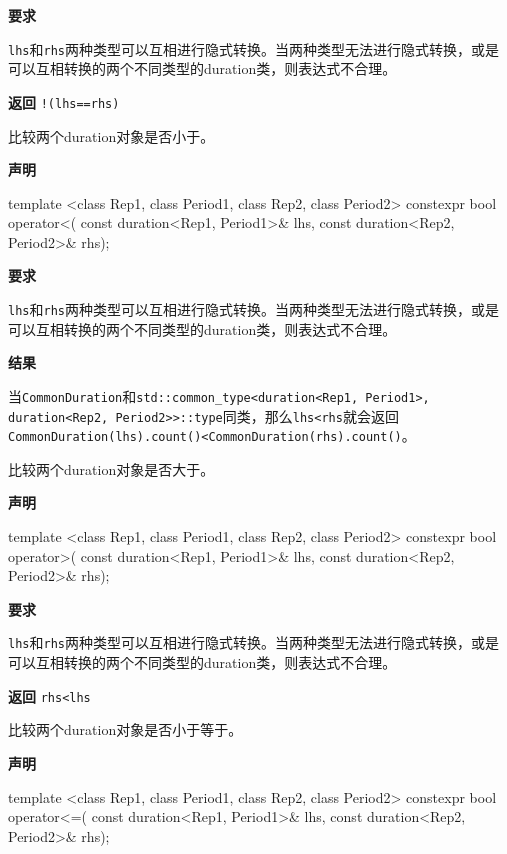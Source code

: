 \textbf{要求}

\texttt{lhs}和\texttt{rhs}两种类型可以互相进行隐式转换。当两种类型无法进行隐式转换，或是可以互相转换的两个不同类型的duration类，则表达式不合理。

\textbf{返回}
\texttt{!(lhs==rhs)}


比较两个duration对象是否小于。

\textbf{声明}

\begin{cpp}
template <class Rep1, class Period1, class Rep2, class Period2>
constexpr bool operator<(
   const duration<Rep1, Period1>& lhs,
   const duration<Rep2, Period2>& rhs);
\end{cpp}

\textbf{要求}

\texttt{lhs}和\texttt{rhs}两种类型可以互相进行隐式转换。当两种类型无法进行隐式转换，或是可以互相转换的两个不同类型的duration类，则表达式不合理。

\textbf{结果}

当\texttt{CommonDuration}和\texttt{std::common\_type<duration<Rep1, Period1>, duration<Rep2, Period2>>::type}同类，那么\texttt{lhs<rhs}就会返回\texttt{CommonDuration(lhs).count()<CommonDuration(rhs).count()}。


比较两个duration对象是否大于。

\textbf{声明}

\begin{cpp}
template <class Rep1, class Period1, class Rep2, class Period2>
constexpr bool operator>(
   const duration<Rep1, Period1>& lhs,
   const duration<Rep2, Period2>& rhs);
\end{cpp}

\textbf{要求}

\texttt{lhs}和\texttt{rhs}两种类型可以互相进行隐式转换。当两种类型无法进行隐式转换，或是可以互相转换的两个不同类型的duration类，则表达式不合理。

\textbf{返回}
\texttt{rhs<lhs}


比较两个duration对象是否小于等于。

\textbf{声明}

\begin{cpp}
template <class Rep1, class Period1, class Rep2, class Period2>
constexpr bool operator<=(
   const duration<Rep1, Period1>& lhs,
   const duration<Rep2, Period2>& rhs);
\end{cpp}

